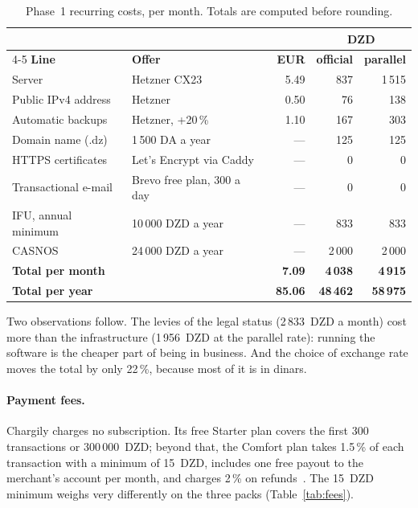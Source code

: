 \begin{table}[htbp]
\centering
\caption{Phase~1 recurring costs, per month. Totals are computed before rounding.}
\label{tab:phase1-costs}
\small
\begin{tabularx}{\textwidth}{@{}l X r r r@{}}
\toprule
 & & & \multicolumn{2}{c}{\textbf{DZD}} \\
\cmidrule(l){4-5}
\textbf{Line} & \textbf{Offer} & \textbf{EUR} & \textbf{official} & \textbf{parallel} \\
\midrule
Server               & Hetzner CX23~\cite{hetzner2026}     & 5.49 & 837 & 1\,515 \\
Public IPv4 address  & Hetzner~\cite{cloudtally2026}        & 0.50 & 76  & 138 \\
Automatic backups    & Hetzner, +20\,\%~\cite{cloudtally2026} & 1.10 & 167 & 303 \\
Domain name (.dz)    & 1\,500 DA a year~\cite{hostarts2026}  & --- & 125 & 125 \\
HTTPS certificates   & Let's Encrypt via Caddy~\cite{caddy2026} & --- & 0 & 0 \\
Transactional e-mail & Brevo free plan, 300 a day~\cite{brevo2026} & --- & 0 & 0 \\
IFU, annual minimum  & 10\,000 DZD a year~\cite{autoentrepreneur2026} & --- & 833 & 833 \\
CASNOS               & 24\,000 DZD a year~\cite{autoentrepreneur2026} & --- & 2\,000 & 2\,000 \\
\midrule
\textbf{Total per month} & & \textbf{7.09} & \textbf{4\,038} & \textbf{4\,915} \\
\textbf{Total per year}  & & \textbf{85.06} & \textbf{48\,462} & \textbf{58\,975} \\
\bottomrule
\end{tabularx}
\end{table}

Two observations follow. The levies of the legal status (2\,833~DZD a month)
cost more than the infrastructure (1\,956~DZD at the parallel rate): running
the software is the cheaper part of being in business. And the choice of
exchange rate moves the total by only 22\,\%, because most of it is in dinars.

\paragraph{Payment fees.} Chargily charges no subscription. Its free Starter
plan covers the first 300 transactions or 300\,000~DZD; beyond that, the Comfort
plan takes 1.5\,\% of each transaction with a minimum of 15~DZD, includes one
free payout to the merchant's account per month, and charges 2\,\% on
refunds~\cite{chargily2026}. The 15~DZD minimum weighs very differently on the
three packs (Table~\ref{tab:fees}).

